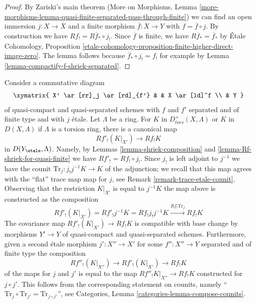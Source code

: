 \begin{proof}
By Zariski's main theorem (More on Morphisms, Lemma
\ref{more-morphisms-lemma-quasi-finite-separated-pass-through-finite})
we can find an open immersion $j : X \to \overline{X}$ and a finite morphism
$\overline{f} : \overline{X} \to Y$ with $f = \overline{f} \circ j$.
By construction we have $Rf_! = R\overline{f}_* \circ j_!$.
Since $\overline{f}$ is finite, we have $R\overline{f}_* = \overline{f}_*$
by \'Etale Cohomology, Proposition
\ref{etale-cohomology-proposition-finite-higher-direct-image-zero}.
The lemma follows because $\overline{f}_* \circ j_! = f_!$
for example by Lemma \ref{lemma-compactify-f-shriek-separated}.
\end{proof}

\begin{remark}[Covariance]
\label{remark-covariance-shriek}
Consider a commutative diagram
$$
\xymatrix{
X' \ar[rr]_j \ar[rd]_{f'} & & X \ar[ld]^f \\
& Y
}
$$
of quasi-compact and quasi-separated schemes with $f$ and $f'$
separated and of finite type and with $j$ \'etale.
Let $\Lambda$ be a ring. For $K$ in $D^+_{tors}(X, \Lambda)$
or $K$ in $D(X, \Lambda)$ if $\Lambda$ is a torsion ring, there
is a canonical map
$$
Rf'_!(K|_{X'}) \longrightarrow Rf_!K
$$
in $D(Y_\etale, \Lambda)$. Namely, by Lemmas \ref{lemma-shriek-composition}
and \ref{lemma-Rf-shriek-for-quasi-finite} we have $Rf'_! = Rf_! \circ j_!$.
Since $j_!$ is left adjoint to $j^{-1}$ we have
the counit $\text{Tr}_j : j_!j^{-1}K \to K$ of the adjunction;
we recall that this map agrees with the ``flat'' trace map map for $j$, see
Remark \ref{remark-trace-etale-counit}.
Observing that the restriction $K|_{X'}$ is equal to $j^{-1}K$
the map above is constructed as the composition
$$
Rf'_!(K|_{X'}) = Rf'_!j^{-1}K = Rf_!j_!j^{-1}K
\xrightarrow{Rf_! \text{Tr}_j}
Rf_!K
$$
The covariance map $Rf'_!(K|_{X'}) \longrightarrow Rf_!K$ is compatible
with base change by morphisms $Y' \to Y$ of quasi-compact and quasi-separated
schemes. Furthermore, given a second \'etale morphism $j' : X'' \to X'$
for some $f'' : X'' \to Y$ separated and of finite type the composition
$$
Rf''_!(K|_{X''}) \longrightarrow Rf'_!(K|_{X'}) \longrightarrow Rf_!K
$$
of the maps for $j$ and $j'$ is equal to the map
$Rf''_!K|_{X''} \longrightarrow Rf_!K$ constructed for $j \circ j'$.
This follows from the corresponding statement on counits, namely
``$\text{Tr}_j \circ \text{Tr}_{j'} = \text{Tr}_{j \circ j'}$'',
see Categories, Lemma \ref{categories-lemma-compose-counits}.
\end{remark}

